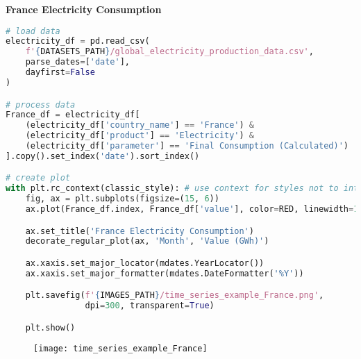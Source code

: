{\noindent\hspace{-12.5pt}\normalsize\bfseries France Electricity Consumption}\vspace{-10pt}
\begin{center}
  \begin{lstlisting}[language=Python, 
  caption={Ежемесячное потребление электричества во Франции.}, 
  label={lst:time_series_example_France}]
# load data
electricity_df = pd.read_csv(
    f'{DATASETS_PATH}/global_electricity_production_data.csv',
    parse_dates=['date'],
    dayfirst=False
)

# process data
France_df = electricity_df[
    (electricity_df['country_name'] == 'France') & 
    (electricity_df['product'] == 'Electricity') & 
    (electricity_df['parameter'] == 'Final Consumption (Calculated)')
].copy().set_index('date').sort_index()

# create plot 
with plt.rc_context(classic_style): # use context for styles not to interfere
    fig, ax = plt.subplots(figsize=(15, 6))
    ax.plot(France_df.index, France_df['value'], color=RED, linewidth=1.5)

    ax.set_title('France Electricity Consumption')
    decorate_regular_plot(ax, 'Month', 'Value (GWh)')

    ax.xaxis.set_major_locator(mdates.YearLocator())
    ax.xaxis.set_major_formatter(mdates.DateFormatter('%Y'))

    plt.savefig(f'{IMAGES_PATH}/time_series_example_France.png', 
                dpi=300, transparent=True)

    plt.show()
  \end{lstlisting}
\end{center}

\begin{figure}[h!]
  \centering
  \texttt{[image: time\_series\_example\_France]}
\end{figure}


